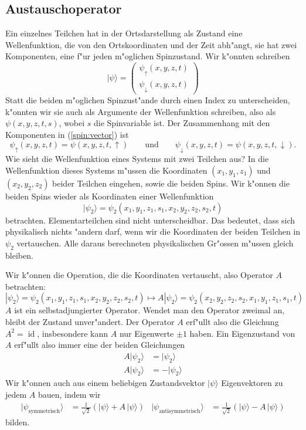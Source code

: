 \subsection{Austauschoperator}
Ein einzelnes Teilchen hat in der Ortsdarstellung als Zustand
eine Wellenfunktion, die von den Ortskoordinaten und der Zeit abh"angt,
sie hat zwei Komponenten, eine f"ur jeden m"oglichen Spinzustand.
Wir k"onnten schreiben
\begin{equation}
|\psi\rangle
=
\begin{pmatrix}
\psi_\uparrow(x,y,z,t)\\
\psi_\downarrow(x,y,z,t)
\end{pmatrix}
\label{spin:vector}
\end{equation}
Statt die beiden m"oglichen Spinzust"ande durch einen Index zu unterscheiden,
k"onnten wir sie auch als Argumente der Wellenfunktion schreiben, also
als $\psi(x,y,z,t,s)$, wobei $s$ die Spinvariable ist. Der Zusammenhang
mit den Komponenten in (\ref{spin:vector}) ist
\[
\psi_\uparrow(x,y,z,t)
=
\psi(x,y,z,t,\uparrow)
\qquad\text{und}\qquad
\psi_\downarrow(x,y,z,t)
=
\psi(x,y,z,t,\downarrow).
\]
Wie sieht die Wellenfunktion eines Systems mit zwei Teilchen aus?
In die Wellenfunktion dieses Systems m"ussen die Koordinaten
$(x_1,y_1,z_1)$ und $(x_2,y_2,z_2)$ beider Teilchen eingehen, 
sowie die beiden Spins. Wir k"onnen die beiden Spins wieder als
Koordinaten einer Wellenfunktion
\[
|\psi_2\rangle
=
\psi_2(x_1,y_1,z_1,s_1,x_2,y_2,z_2,s_2,t)
\]
betrachten.
Elementarteilchen sind nicht unterscheidbar. Das bedeutet, dass sich
physikalisch nichts "andern darf, wenn wir die Koordinaten der beiden
Teilchen in $\psi_2$ vertauschen. Alle daraus berechneten physikalischen
Gr"ossen m"ussen gleich bleiben.

Wir k"onnen die Operation, die die Koordinaten vertauscht, also
Operator $A$ betrachten:
\[
|\psi_2\rangle
=
\psi_2(x_1,y_1,z_1,s_1,x_2,y_2,z_2,s_2,t)
\mapsto
A|\psi_2\rangle
=
\psi_2(x_2,y_2,z_2,s_2,x_1,y_1,z_1,s_1,t)
\]
$A$ ist ein selbstadjungierter Operator.
Wendet man den Operator zweimal an, bleibt der Zustand unver"andert.
Der Operator $A$ erf"ullt also die Gleichung $A^2=\operatorname{id}$,
insbesondere kann $A$ nur Eigenwerte $\pm 1$ haben.
Ein Eigenzustand von $A$ erf"ullt also immer eine der beiden 
Gleichungen
\begin{align*}
A|\psi_2\rangle &= |\psi_2\rangle
\tag{symmetrisch}
\\
A|\psi_2\rangle &=-|\psi_2\rangle
\tag{antisymmetrisch}
\end{align*}
Wir k"onnen auch aus einem beliebigen Zustandsvektor $|\psi\rangle$
Eigenvektoren zu jedem $A$ bauen, indem wir
\begin{align*}
|\psi_\text{symmetrisch}\rangle
&=
\frac1{\sqrt{2}}(|\psi\rangle + A\,|\psi\rangle)
&
|\psi_\text{antisymmetrisch}\rangle
&=
\frac1{\sqrt{2}}(|\psi\rangle - A\,|\psi\rangle)
\end{align*}
bilden.

